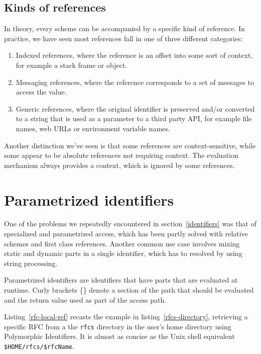 \documentclass[preprint,authoryear]{llncs}
\begin{document}
\subsection{Kinds of references}
\label{refkinds}
In theory, every scheme can be accompanied by a specific kind of reference.  In practice, we have 
seen most references fall in one of three different categories:

\begin{enumerate}
\item Indexed references, where the reference is an offset into some sort of context, for
	example a stack frame or object.
\item Messaging references, where the reference corresponds to a set of messages to
	access the value.
\item Generic references, where the original identifier is preserved and/or converted to
	a string that is used as a parameter to a third party API, for example file names,
	web URLs or environment variable names.
\end{enumerate}

Another distinction we've seen is that some references are context-sensitive, while some
appear to be absolute references not requiring context.  The evaluation mechanism always
provides a context, which is ignored by some references.  


\section{Parametrized identifiers}
\label{parametrized}

One of the problems we repeatedly encountered in section~\ref{identifiers} was 
that of specialized and parametrized access, which has been partly solved with
relative schemes and first class references.  Another common use case involves
mixing static and dynamic parts in a single identifier, which has to resolved by
using string processing.

Parametrized identifiers are identifiers that have parts that are evaluated
at runtime.  Curly brackets \{\} denote a section of the path that should be evaluated and
the return value used as part of the access path.

Listing~\ref{rfc-local-ref} recasts the example in listing~\ref{rfcs-directory}, retrieving a specific RFC from a 
the {\tt rfcs} directory in the user's home directory using Polymorphic Identifiers.  It is almost
as concise as the Unix shell equivalent {\tt \$HOME/rfcs/\$rfcName}.
\end{document}

